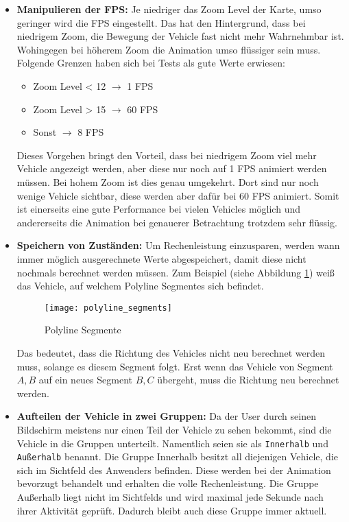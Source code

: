     \begin{itemize}
      \item \textbf{Manipulieren der FPS:} Je niedriger das Zoom Level der Karte, umso geringer wird die FPS eingestellt. Das hat den Hintergrund, dass bei niedrigem Zoom, die Bewegung der Vehicle fast nicht mehr Wahrnehmbar ist. Wohingegen bei höherem Zoom die Animation umso flüssiger sein muss. Folgende Grenzen haben sich bei Tests als gute Werte erwiesen:
      \begin{itemize}
        \item Zoom Level < 12 $\rightarrow$ 1 FPS
        \item Zoom Level > 15 $\rightarrow$ 60 FPS
        \item Sonst $\rightarrow$ 8 FPS
      \end{itemize}
      Dieses Vorgehen bringt den Vorteil, dass bei niedrigem Zoom viel mehr Vehicle angezeigt werden, aber diese nur noch auf 1 FPS animiert werden müssen. Bei hohem Zoom ist dies genau umgekehrt. Dort sind nur noch wenige Vehicle sichtbar, diese werden aber dafür bei 60 FPS animiert. Somit ist einerseits eine gute Performance bei vielen Vehicles möglich und andererseits die Animation bei genauerer Betrachtung trotzdem sehr flüssig.

      \item \textbf{Speichern von Zuständen:} Um Rechenleistung einzusparen, werden wann immer möglich ausgerechnete Werte abgespeichert, damit diese nicht nochmals berechnet werden müssen. Zum Beispiel (siehe Abbildung \ref{fig:polyline_segments}) weiß das Vehicle, auf welchem Polyline Segment\footnotemark es sich befindet. 


      \begin{figure}[htbp]
        \begin{center}
          \texttt{[image: polyline\_segments]}
          \caption{Polyline Segmente}
          \label{fig:polyline_segments}
        \end{center}
      \end{figure}

      Das bedeutet, dass die Richtung des Vehicles nicht neu berechnet werden muss, solange es diesem Segment folgt. Erst wenn das Vehicle von Segment $A,B$ auf ein neues Segment $B,C$ übergeht, muss die Richtung neu berechnet werden.

      \item \textbf{Aufteilen der Vehicle in zwei Gruppen:} Da der User durch seinen Bildschirm meistens nur einen Teil der Vehicle zu sehen bekommt, sind die Vehicle in die Gruppen unterteilt. Namentlich seien sie als \texttt{Innerhalb} und \texttt{Außerhalb} benannt. Die Gruppe Innerhalb besitzt all diejenigen Vehicle, die sich im Sichtfeld des Anwenders befinden. Diese werden bei der Animation bevorzugt behandelt und erhalten die volle Rechenleistung. Die Gruppe Außerhalb liegt nicht im Sichtfelds und wird maximal jede Sekunde nach ihrer Aktivität geprüft. Dadurch bleibt auch diese Gruppe immer aktuell.      
    \end{itemize}
